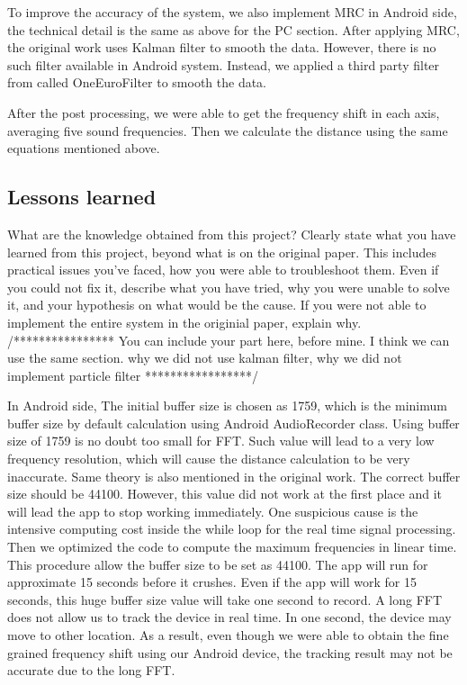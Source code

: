 \documentclass{acm_proc_article-sp}
\begin{document}
To improve the accuracy of the system, we also implement MRC in Android side, the 
technical detail is the same as above for the PC section. After applying MRC, the original
work uses Kalman filter to smooth the data. However, there is no such filter available in
Android system. Instead, we applied a third party filter from
\cite{SignalFilter} called OneEuroFilter to smooth the data.

After the post processing, we were able to get the frequency shift in each axis, averaging
five sound frequencies. Then we calculate the distance using the same equations mentioned
above.

\subsection{Lessons learned}
What are the knowledge obtained from this project? Clearly
state what you have learned from this project, beyond what
is on the original paper. This includes practical issues you’ve
faced, how you were able to troubleshoot them.  Even if you
could not fix it, describe what you have tried, why you were
unable to solve it, and your hypothesis on what would be the
cause.  If you were not able to implement the entire system
in the originial paper, explain why.
/****************
You can include your part here, before mine. I think we can use the same section.
why we did not use kalman filter, why we did not implement particle filter
*****************/

In Android side, The initial buffer size is chosen as 1759, which is the minimum
buffer size by default calculation using Android AudioRecorder class. 
Using buffer size of 1759 is no doubt too small for FFT. Such value
will lead to a very low frequency resolution, which will cause the distance calculation
to be very inaccurate. Same theory is also mentioned in the original work. The correct
buffer size should be 44100. However, this value did not work at the first place and 
it will lead the app to stop working immediately. One suspicious cause is the intensive
computing cost inside the while loop for the real time signal processing. Then we 
optimized the code to compute the maximum frequencies in linear time. This procedure 
allow the buffer size to be set as 44100. The app will run for approximate 15 seconds
before it crushes.
Even if the app will work for 15 seconds, this huge buffer size value will take one
second to record. A long FFT does not allow us to track the device in real time. In one
second, the device may move to other location. As a result, even though we were able to
obtain the fine grained frequency shift using our Android device, the tracking result 
may not be accurate due to the long FFT.
\end{document}
